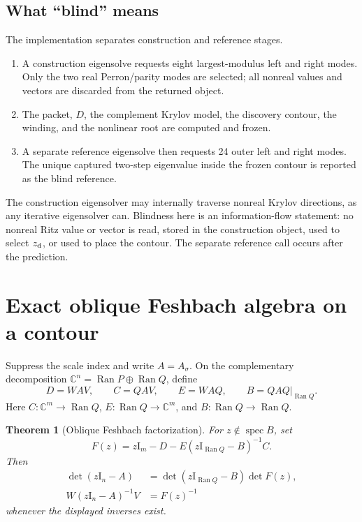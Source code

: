 \documentclass[11pt]{article}
\newtheorem{theorem}{Theorem}[section]
\theoremstyle{definition}
\theoremstyle{remark}
\newcommand{\C}{\mathbb C}
\newcommand{\Id}{\mathrm I}
\newcommand{\Ran}{\operatorname{Ran}}
\newcommand{\spec}{\operatorname{spec}}
\begin{document}
\subsection{What ``blind'' means}
\label{sec:blind-definition}

The implementation separates construction and reference stages.

\begin{enumerate}
 \item A construction eigensolve requests eight largest-modulus left and
 right modes.  Only the two real Perron/parity modes are selected; all
 nonreal values and vectors are discarded from the returned object.
 \item The packet, $D$, the complement Krylov model, the discovery contour,
 the winding, and the nonlinear root are computed and frozen.
 \item A separate reference eigensolve then requests 24 outer left and right
 modes.  The unique captured two-step eigenvalue inside the frozen contour
 is reported as the blind reference.
\end{enumerate}

The construction eigensolver may internally traverse nonreal Krylov
directions, as any iterative eigensolver can.  Blindness here is an
information-flow statement: no nonreal Ritz value or vector is read, stored
in the construction object, used to select $z_{\rm d}$, or used to place the
contour.  The separate reference call occurs after the prediction.

\section{Exact oblique Feshbach algebra on a contour}
\label{sec:exact-feshbach}

Suppress the scale index and write $A=A_\sigma$.  On the complementary
decomposition $\C^n=\Ran P\oplus\Ran Q$, define
\begin{equation}
 D=WAV,\qquad C=QAV,\qquad E=WAQ,
 \qquad B=QAQ\big|_{\Ran Q}.
 \label{eq:block-definitions}
\end{equation}
Here $C:\C^m\to\Ran Q$, $E:\Ran Q\to\C^m$, and
$B:\Ran Q\to\Ran Q$.

\begin{theorem}[Oblique Feshbach factorization]
\label{thm:exact-feshbach}
For $z\notin\spec B$, set
\begin{equation}
 F(z)=z\Id_m-D-E(z\Id_{\Ran Q}-B)^{-1}C.
 \label{eq:exact-feshbach}
\end{equation}
Then
\begin{align}
 \det(z\Id_n-A)
 &=\det(z\Id_{\Ran Q}-B)\det F(z),
 \label{eq:exact-det-factorization}\\
 W(z\Id_n-A)^{-1}V&=F(z)^{-1}
 \label{eq:compressed-resolvent}
\end{align}
whenever the displayed inverses exist.
\end{theorem}
\end{document}
